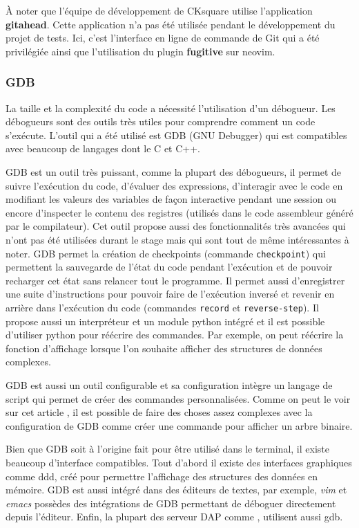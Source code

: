 \documentclass[a4paper]{article}
\begin{document}
À noter que l'équipe de développement de CKsquare utilise l'application
\textbf{gitahead}. Cette application n'a pas été utilisée pendant le
développement du projet de tests. Ici, c'est l'interface en ligne de commande de Git
qui a été privilégiée ainsi que l'utilisation du plugin \textbf{fugitive} sur
neovim.
\subsubsection{GDB}%

La taille et la complexité du code a nécessité l'utilisation d'un débogueur. Les
débogueurs sont des outils très utiles pour comprendre comment un code
s'exécute. L'outil qui a été utilisé est GDB (GNU Debugger) qui est compatibles
avec beaucoup de langages dont le C et C++.

GDB est un outil très puissant, comme la plupart des débogueurs, il permet de
suivre l'exécution du code, d'évaluer des expressions, d'interagir avec le code
en modifiant les valeurs des variables de façon interactive pendant une session
ou encore d'inspecter le contenu des registres (utilisés dans le code assembleur
généré par le compilateur). Cet outil propose aussi des fonctionnalités très
avancées qui n'ont pas été utilisées durant le stage mais qui sont tout de même
intéressantes à noter. GDB permet la création de checkpoints (commande
\verb|checkpoint|) qui permettent la sauvegarde de l'état du code pendant
l'exécution et de pouvoir recharger cet état sans relancer tout le programme. Il
permet aussi d'enregistrer une suite d'instructions pour pouvoir faire de
l'exécution inversé et revenir en arrière dans l'exécution du code (commandes
\verb|record| et \verb|reverse-step|). Il propose aussi un interpréteur et un
module python intégré et il est possible d'utiliser python pour réécrire des
commandes. Par exemple, on peut réécrire la fonction d'affichage lorsque l'on
souhaite afficher des structures de données complexes.

GDB est aussi un outil configurable et sa configuration intègre un langage de
script qui permet de créer des commandes personnalisées. Comme on peut le voir
sur cet article \cite{gdbinit}, il est possible de faire des choses assez
complexes avec la configuration de GDB comme créer une commande pour afficher un
arbre binaire.

Bien que GDB soit à l'origine fait pour être utilisé dans le terminal, il existe
beaucoup d'interface compatibles. Tout d'abord il existe des interfaces
graphiques comme ddd, créé pour permettre l'affichage des structures des données
en mémoire. GDB est aussi intégré dans des éditeurs de textes, par exemple,
\textit{vim} et \textit{emacs} possèdes des intégrations de GDB permettant de
déboguer directement depuis l'éditeur. Enfin, la plupart des serveur DAP
comme , utilisent aussi gdb.
\end{document}
